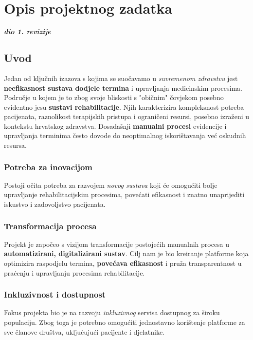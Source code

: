 \chapter{Opis projektnog zadatka}
		
		\textbf{\textit{dio 1. revizije}}\\

        \section*{Uvod}

        Jedan od ključnih izazova s kojima se suočavamo u \textit{suvremenom zdravstvu} jest \textbf{neefikasnost sustava dodjele termina} i upravljanja medicinskim procesima. Područje u kojem je to zbog svoje bliskosti s "običnim" čovjekom posebno evidentno jesu \textbf{sustavi rehabilitacije}. Njih karakterizira kompleksnost potreba pacijenata, raznolikost terapijskih pristupa i ograničeni resursi, posebno izraženi u kontekstu hrvatskog zdravstva. Dosadašnji \textbf{manualni procesi} evidencije i upravljanja terminima često dovode do neoptimalnog iskorištavanja već oskudnih resursa.
        
        \subsection*{\textbf{\large Potreba za inovacijom}}
        Postoji očita potreba za razvojem \textit{novog sustava} koji će omogućiti bolje upravljanje rehabilitacijskim procesima, povećati efikasnost i znatno unaprijediti iskustvo i zadovoljstvo pacijenata.
        
        \subsection*{\textbf{\large Transformacija procesa}}
        Projekt je započeo s vizijom transformacije postojećih manualnih procesa u \textbf{automatizirani, digitalizirani sustav}. Cilj nam je bio kreiranje platforme koja optimizira raspodjelu termina, \textbf{povećava efikasnost} i pruža transparentnost u praćenju i upravljanju procesima rehabilitacije.
        
        \subsection*{\textbf{\large Inkluzivnost i dostupnost}}
        Fokus projekta bio je na razvoju \textit{inkluzivnog} servisa dostupnog za široku populaciju. Zbog toga je potrebno omogućiti jednostavno korištenje platforme za sve članove društva, uključujući pacijente i djelatnike.
        
